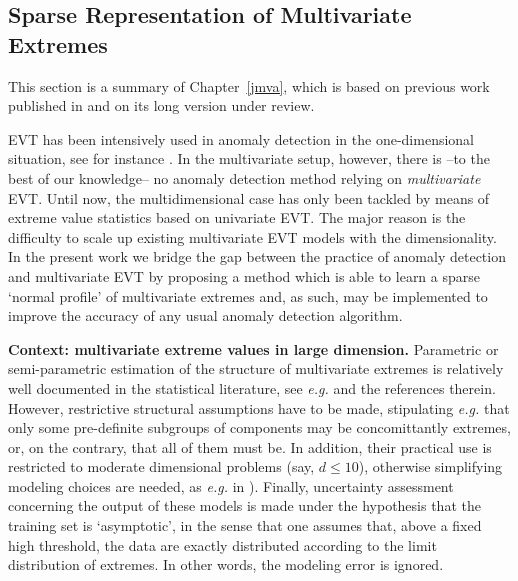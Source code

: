 \subsection{Sparse Representation of Multivariate Extremes}
\label{resume_fr:sec:JMVA}
This section is a summary of Chapter~\ref{jmva}, which is based on previous work published in \cite{AISTAT16} and on its long version \cite{ARXIV16} under review.

EVT has been intensively used in anomaly detection in the one-dimensional
situation, see for instance \cite{Roberts99, Roberts2000, Clifton2011, Clifton2008, Lee2008}.
In the multivariate setup, however, there is --to the best of our
knowledge--  no anomaly detection method
relying on \textit{multivariate} EVT. Until now, the multidimensional case has only been  tackled by means of extreme value statistics
based on univariate EVT. The major reason is 
the difficulty to scale up existing multivariate EVT models
with the dimensionality. In the present work we bridge the gap between the practice of anomaly detection and multivariate EVT by proposing a method which is
able to learn a sparse `normal profile' of multivariate extremes and,
as such, may be implemented to improve the accuracy of any usual anomaly detection algorithm.

\textbf{Context: multivariate extreme values in large dimension.}
Parametric or semi-parametric estimation of the structure of multivariate extremes is relatively well documented in the statistical literature, see  \emph{e.g.} \cite{coles1991modeling,fougeres2009models,cooley2010pairwise,sabourinNaveau2012} and the references therein. However, restrictive structural assumptions have to be made, stipulating \emph{e.g.} that only some pre-definite subgroups of components may be concomittantly extremes, or, on the contrary, that all of them must be. In addition, their practical use is restricted to moderate dimensional problems (say, $d\le 10$), otherwise simplifying modeling choices are needed, as \emph{e.g.} in \cite{stephenson2009high}). Finally, uncertainty assessment concerning the output of these models is made under the hypothesis that the training set is `asymptotic', in the sense that one assumes that, above a fixed high threshold, the data are exactly distributed according to the limit distribution of extremes. In other words, the modeling error is ignored. 

